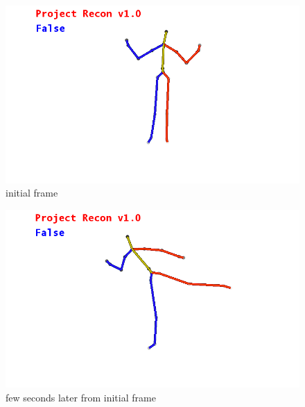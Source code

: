 \begin{figure}[!htbp]
\centering
\includegraphics[width=1\textwidth]{images/skeleton_frame1.png}
\caption{initial frame}
\label{skeletonframe1}
\end{figure}

\begin{figure}[!htbp]
\centering
\includegraphics[width=1\textwidth]{images/skeleton_frame2.png}
\caption{few seconds later from initial frame}
\label{skeletonframe2}
\end{figure}

